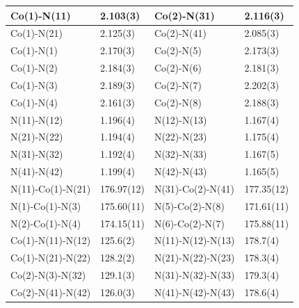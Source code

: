 \renewcommand{\arraystretch}{1.5}
\begin{table}
\centering
\begin{tabular}{|l|l|l|l|}
\hline
Co(1)-N(11) & 2.103(3) & Co(2)-N(31) & 2.116(3)\\
\hline
Co(1)-N(21) & 2.125(3) & Co(2)-N(41) & 2.085(3)\\
\hline
Co(1)-N(1) & 2.170(3) & Co(2)-N(5) & 2.173(3)\\
\hline
Co(1)-N(2) & 2.184(3) & Co(2)-N(6) & 2.181(3)\\
\hline
Co(1)-N(3) & 2.189(3) & Co(2)-N(7) & 2.202(3)\\
\hline
Co(1)-N(4) & 2.161(3) & Co(2)-N(8) & 2.188(3)\\
\hline
N(11)-N(12) & 1.196(4) & N(12)-N(13) & 1.167(4)\\
\hline
N(21)-N(22) & 1.194(4) & N(22)-N(23) & 1.175(4)\\
\hline
N(31)-N(32) & 1.192(4) & N(32)-N(33) & 1.167(5)\\
\hline
N(41)-N(42) & 1.199(4) & N(42)-N(43) & 1.165(5)\\
\hline
\hline
N(11)-Co(1)-N(21) & 176.97(12) & N(31)-Co(2)-N(41) & 177.35(12)\\
\hline
N(1)-Co(1)-N(3) & 175.60(11) & N(5)-Co(2)-N(8) & 171.61(11)\\
\hline
N(2)-Co(1)-N(4) & 174.15(11) & N(6)-Co(2)-N(7) & 175.88(11)\\
\hline
Co(1)-N(11)-N(12) & 125.6(2) & N(11)-N(12)-N(13) & 178.7(4)\\
\hline
Co(1)-N(21)-N(22) & 128.2(2) & N(21)-N(22)-N(23) & 178.3(4)\\
\hline
Co(2)-N(3)-N(32) & 129.1(3) & N(31)-N(32)-N(33) & 179.3(4)\\
\hline
Co(2)-N(41)-N(42) & 126.0(3) & N(41)-N(42)-N(43) & 178.6(4)\\
\hline
\end{tabular}
\label{batlb:CoA4MOP}
\end{table}













